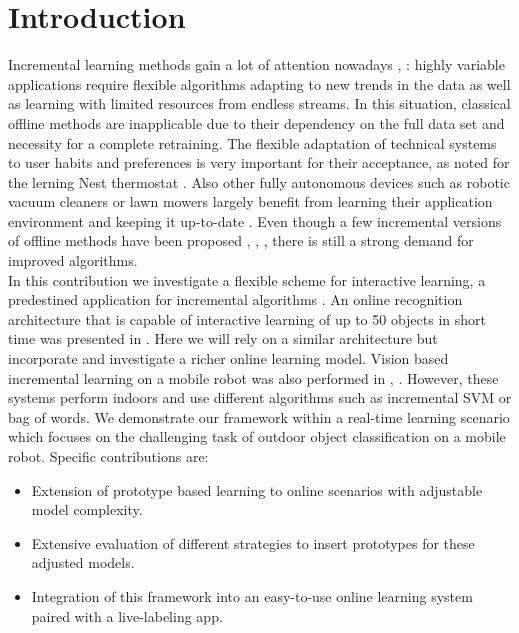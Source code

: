 \documentclass[conference]{IEEEtran}
\begin{document}
\section{Introduction}
Incremental learning methods gain a lot of attention nowadays \cite{6628010}, \cite{hoi2014libol}:
highly variable applications 
require flexible algorithms adapting to new trends in the data as well as learning with limited resources from
endless streams. In this situation, classical offline methods are inapplicable due to their dependency on the full data set and necessity for a complete retraining.
The flexible adaptation of technical systems to user habits and preferences is very important for their acceptance,
as noted for the lerning Nest thermostat \cite{Yang:2013:LLT:2493432.2493489}.
Also other fully autonomous devices such as robotic vacuum cleaners or lawn mowers largely benefit from learning 
their application environment and keeping it up-to-date \cite{Forlizzi:2006:SRD:1121241.1121286}. 
Even though a few incremental versions of offline methods have been proposed \cite{1682016}, \cite{conf/iberamia/DiasC08}, \cite{cauwenbergs01incrementaldecremental}, there is still a strong demand
for improved algorithms.\\
In this contribution we investigate a flexible
scheme for interactive learning, a predestined application for incremental algorithms \cite{export:238110}.
An online recognition architecture that is capable of interactive learning of up to 50 objects in short time was presented in \cite{PN0805}.
Here we will rely on a similar architecture but incorporate and investigate a richer online learning model.
Vision based incremental learning on a mobile robot was also performed in \cite{4398986}, \cite{4650681}. However, these systems
perform indoors and use different algorithms such as incremental SVM or bag of words.
We demonstrate our framework within a real-time learning scenario which focuses on the challenging task of outdoor object classification on a mobile robot. 
Specific contributions are: 
\begin{itemize}
\item 
Extension of prototype based learning to online scenarios with adjustable model complexity.
\item
Extensive evaluation of different strategies to insert prototypes for these adjusted models.
\item
Integration of this framework into an easy-to-use online learning system paired with a live-labeling app.
\end{itemize}
\end{document}
